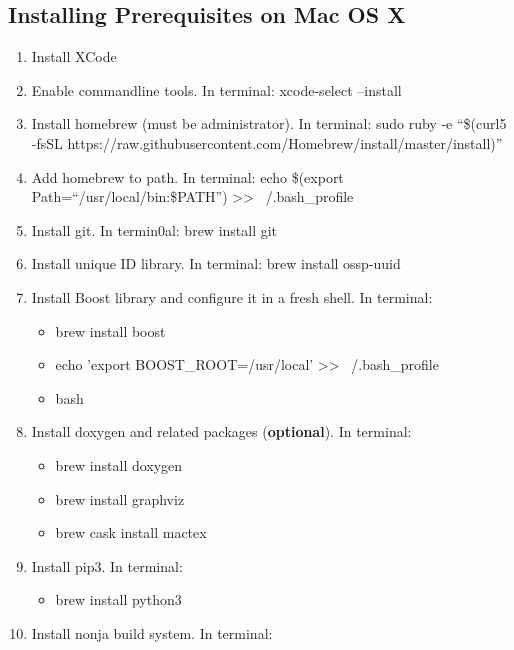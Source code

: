 \subsection{Installing Prerequisites on Mac OS
X}\label{installing-prerequisites-on-mac-os-x}

\begin{enumerate}
\def\labelenumi{\arabic{enumi}.}
\item
  Install XCode
\item
  Enable commandline tools. In terminal: xcode-select --install
\item
  Install homebrew (must be administrator). In terminal: sudo ruby -e
  ``\$(curl5 -fsSL
  https://raw.githubusercontent.com/Homebrew/install/master/install)''
\item
  Add homebrew to path. In terminal: echo \$(export
  Path=``/usr/local/bin:\$PATH'') \textgreater{}\textgreater{}
  ~/.bash\_profile
\item
  Install git. In termin0al: brew install git
\item
  Install unique ID library. In terminal: brew install ossp-uuid
\item
  Install Boost library and configure it in a fresh shell. In terminal:

  \begin{itemize}
  \item
    brew install boost
  \item
    echo 'export BOOST\_ROOT=/usr/local' \textgreater{}\textgreater{}
    ~/.bash\_profile
  \item
    bash
  \end{itemize}
\item
  Install doxygen and related packages (\textbf{optional}). In terminal:

  \begin{itemize}
  \item
    brew install doxygen
  \item
    brew install graphviz
  \item
    brew cask install mactex
  \end{itemize}
\item
  Install pip3. In terminal:

  \begin{itemize}
  \tightlist
  \item
    brew install python3
  \end{itemize}
\item
  Install nonja build system. In terminal:


\end{enumerate}
